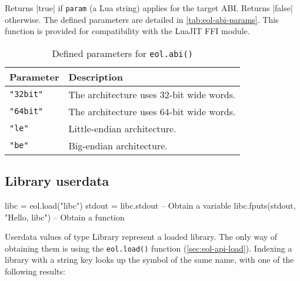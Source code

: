 Returns \Mlua|true| if \texttt{param} (a Lua string) applies for the target
\gls{ABI}. Returns \Mlua|false| otherwise. The defined parameters are detailed
in \autoref{tab:eol-abi-params}. This function is provided for compatibility
with the LuaJIT FFI module.

\begin{table}[htH]
	\centering
	\begin{tabular}{ll}
		\toprule
		Parameter & Description \\
		\midrule
		\texttt{"32bit"} & The architecture uses 32-bit wide words. \\
		\texttt{"64bit"} & The architecture uses 64-bit wide words. \\
		\midrule
		\texttt{"le"} & Little-endian architecture. \\
		\texttt{"be"} & Big-endian architecture. \\
		\bottomrule
	\end{tabular}
	\caption{Defined parameters for \texttt{eol.abi()}}
	\label{tab:eol-abi-params}
\end{table}


%
%
%
%


\subsection{Library userdata}
	\label{sec:eol-api-library-t}

\begin{luacode}
libc = eol.load("libc")
stdout = libc.stdout  -- Obtain a variable
libc.fputs(stdout, "Hello, libc\n")  -- Obtain a function
\end{luacode}

Userdata values of type \textsf{Library} represent a loaded library. The only
way of obtaining them is using the \texttt{eol.load()} function
(\autoref{sec:eol-api-load}). Indexing a library with a string key looks up
the symbol of the same name, with one of the following results:

